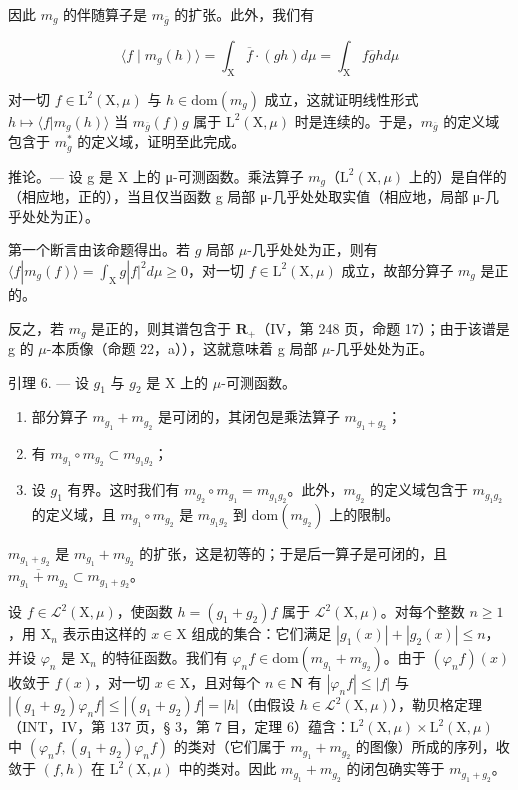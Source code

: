 因此 \(m_{g}\) 的伴随算子是 \(m_{\overline{g}}\) 的扩张。此外，我们有

\[
\langle f \mid m _ {g} (h) \rangle = \int_ {\mathrm{X}} \overline {{f}} \cdot (g h) d \mu = \int_ {\mathrm{X}} f \overline {{g}} h d \mu
\]

对一切 \(f \in \mathrm{L}^{2}(\mathrm{X}, \mu)\) 与 \(h \in \mathrm{dom}(m_{g})\) 成立，这就证明线性形式 \(h \mapsto \langle f | m_{g}(h) \rangle\) 当 \(m_{\overline{g}}(f) g\) 属于 \(\mathrm{L}^{2}(\mathrm{X}, \mu)\) 时是连续的。于是，\(m_{\overline{g}}\) 的定义域包含于 \(m_{g}^{*}\) 的定义域，证明至此完成。

推论。--- 设 g 是 X 上的 μ-可测函数。乘法算子 \(m_{g}\)（\(\mathrm{L}^{2}(\mathrm{X},\mu)\) 上的）是自伴的（相应地，正的），当且仅当函数 g 局部 μ-几乎处处取实值（相应地，局部 μ-几乎处处为正）。

第一个断言由该命题得出。若 \(g\) 局部 \(\mu\)-几乎处处为正，则有 \(\langle f|m_{g}(f)\rangle=\int_{\mathrm{X}}g|f|^{2}d\mu\geqslant0\)，对一切 \(f\in\mathrm{L}^{2}(\mathrm{X},\mu)\) 成立，故部分算子 \(m_{g}\) 是正的。

反之，若 \(m_{g}\) 是正的，则其谱包含于 \(\mathbf{R}_{+}\)（IV，第 248 页，命题 17）；由于该谱是 g 的 \(\mu\)-本质像（命题 22，a）），这就意味着 g 局部 \(\mu\)-几乎处处为正。

引理 6. --- 设 \(g_{1}\) 与 \(g_{2}\) 是 X 上的 \(\mu\)-可测函数。

\begin{enumerate}
\def\labelenumi{\alph{enumi})}
\item
  部分算子 \(m_{g_{1}} + m_{g_{2}}\) 是可闭的，其闭包是乘法算子 \(m_{g_{1}+g_{2}}\)；
\item
  有 \(m_{g_{1}} \circ m_{g_{2}} \subset m_{g_{1}g_{2}}\)；
\item
  设 \(g_{1}\) 有界。这时我们有 \(m_{g_{2}} \circ m_{g_{1}} = m_{g_{1}g_{2}}\)。此外，\(m_{g_{2}}\) 的定义域包含于 \(m_{g_{1}g_{2}}\) 的定义域，且 \(m_{g_{1}} \circ m_{g_{2}}\) 是 \(m_{g_{1}g_{2}}\) 到 \(\text{dom}(m_{g_{2}})\) 上的限制。
\end{enumerate}

\(m_{g_{1}+g_{2}}\) 是 \(m_{g_{1}} + m_{g_{2}}\) 的扩张，这是初等的；于是后一算子是可闭的，且 \(\overline{m_{g_{1}} + m_{g_{2}}} \subset m_{g_{1}+g_{2}}\)。

设 \(f \in \mathcal{L}^2(\mathrm{X},\mu)\)，使函数 \(h = (g_1 + g_2)f\) 属于 \(\mathcal{L}^2(\mathrm{X},\mu)\)。对每个整数 \(n \geqslant 1\)，用 \(\mathrm{X}_n\) 表示由这样的 \(x \in \mathrm{X}\) 组成的集合：它们满足 \(|g_1(x)| + |g_2(x)| \leqslant n\)，并设 \(\varphi_n\) 是 \(\mathrm{X}_n\) 的特征函数。我们有 \(\varphi_n f \in \mathrm{dom}(m_{g_1} + m_{g_2})\)。由于 \((\varphi_n f)(x)\) 收敛于 \(f(x)\)，对一切 \(x \in \mathrm{X}\)，且对每个 \(n \in \mathbf{N}\) 有 \(|\varphi_n f| \leqslant |f|\) 与 \(|(g_1 + g_2)\varphi_n f| \leqslant |(g_1 + g_2)f| = |h|\)（由假设 \(h \in \mathcal{L}^2(\mathrm{X},\mu)\)），勒贝格定理（INT，IV，第 137 页，§ 3，第 7 目，定理 6）蕴含：\(\mathrm{L}^{2}(\mathrm{X},\mu)\times\mathrm{L}^{2}(\mathrm{X},\mu)\) 中 \((\varphi_{n}f,(g_{1}+g_{2})\varphi_{n}f)\) 的类对（它们属于 \(m_{g_{1}}+m_{g_{2}}\) 的图像）所成的序列，收敛于 \((f,h)\) 在 \(\mathrm{L}^{2}(\mathrm{X},\mu)\) 中的类对。因此 \(m_{g_{1}}+m_{g_{2}}\) 的闭包确实等于 \(m_{g_{1}+g_{2}}\)。

